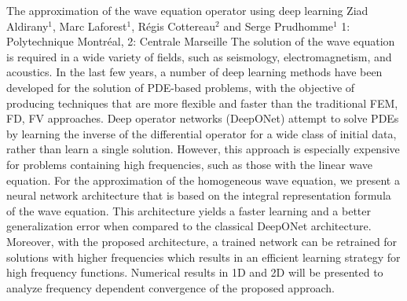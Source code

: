 \vspace{1.5ex}
\abs
{The approximation of the wave equation operator using deep learning }
{Ziad Aldirany$^{1}$, Marc Laforest$^{1}$, Régis Cottereau$^{2}$ and Serge
Prudhomme$^{1}$}
{1: Polytechnique Montréal, 2: Centrale Marseille}
{The solution of the wave equation is required in a wide variety of
fields, such as seismology, electromagnetism, and acoustics. In the
last few years, a number of deep learning methods have been developed for the solution
of PDE-based problems, with the objective of producing techniques that
are more flexible and faster than the traditional FEM, FD, FV
approaches. Deep operator networks (DeepONet) attempt to solve PDEs by
learning the inverse of the differential operator for a wide class of
initial data, rather than learn a single solution. However, this
approach is especially expensive for problems containing high
frequencies, such as those with the linear wave equation.
For the approximation of the homogeneous wave equation, we present a
neural network architecture that is based on the integral
representation formula of the wave equation.
This architecture yields a faster learning and a better generalization
error when compared to the classical DeepONet architecture. Moreover,
with the proposed architecture, a trained network can be retrained for
solutions with higher frequencies which results in an efficient
learning strategy for high frequency functions.
Numerical results in 1D and 2D will be presented to analyze frequency
dependent convergence of the proposed approach. }


